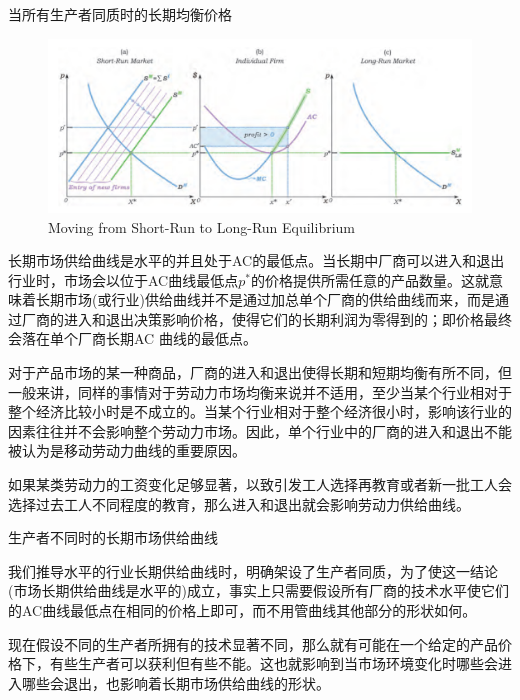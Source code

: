 \documentclass{article}
\begin{document}
当所有生产者同质时的长期均衡价格
\begin{figure}[H] %
	\centering %
	\includegraphics[width=1\textwidth]{14_2} %
	\caption{Moving from Short-Run to Long-Run Equilibrium} %
	\label{Fig.main3} %
\end{figure}

长期市场供给曲线是水平的并且处于AC的最低点。当长期中厂商可以进入和退出行业时，市场会以位于AC曲线最低点$ p^* $的价格提供所需任意的产品数量。这就意味着长期市场(或行业)供给曲线并不是通过加总单个厂商的供给曲线而来，而是通过厂商的进入和退出决策影响价格，使得它们的长期利润为零得到的；即价格最终会落在单个厂商长期AC
曲线的最低点。

\hspace*{\fill}

对于产品市场的某一种商品，厂商的进入和退出使得长期和短期均衡有所不同，但一般来讲，同样的事情对于劳动力市场均衡来说并不适用，至少当某个行业相对于整个经济比较小时是不成立的。当某个行业相对于整个经济很小时，影响该行业的因素往往并不会影响整个劳动力市场。因此，单个行业中的厂商的进入和退出不能被认为是移动劳动力曲线的重要原因。

如果某类劳动力的工资变化足够显著，以致引发工人选择再教育或者新一批工人会选择过去工人不同程度的教育，那么进入和退出就会影响劳动力供给曲线。

\hspace*{\fill}

生产者不同时的长期市场供给曲线

我们推导水平的行业长期供给曲线时，明确架设了生产者同质，为了使这一结论(市场长期供给曲线是水平的)成立，事实上只需要假设所有厂商的技术水平使它们的AC曲线最低点在相同的价格上即可，而不用管曲线其他部分的形状如何。

现在假设不同的生产者所拥有的技术显著不同，那么就有可能在一个给定的产品价格下，有些生产者可以获利但有些不能。这也就影响到当市场环境变化时哪些会进入哪些会退出，也影响着长期市场供给曲线的形状。
\end{document}
